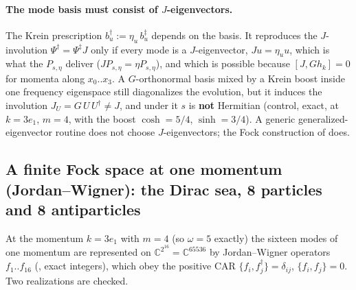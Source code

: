 \paragraph{The mode basis must consist of $J$-eigenvectors.} The Krein prescription
$b_u^{\dagger}:=\eta_u\,b_u^{\ddagger}$ depends on the basis. It reproduces the $J$-involution
$\Psi^{\dagger}=\Psi^{\ddagger}J$ only if every mode is a $J$-eigenvector, $Ju=\eta_u u$, which is what
the $P_{s,\eta}$ deliver ($JP_{s,\eta}=\eta P_{s,\eta}$), and which is possible because
$[J,Gh_k]=0$ for momenta along $x_0..x_3$. A $G$-orthonormal basis mixed by a Krein boost inside one
frequency eigenspace still diagonalizes the evolution, but it induces the involution
$J_U=G\,U\,U^{\dagger}\neq J$, and under it $s$ is \textbf{not} Hermitian (control, exact, at $k=3e_1$,
$m=4$, with the boost $\cosh=5/4$, $\sinh=3/4$). A generic generalized-eigenvector routine does not
choose $J$-eigenvectors; the Fock construction of  does. 

\subsection{A finite Fock space at one momentum (Jordan--Wigner): the Dirac sea, 8 particles and 8 antiparticles}
\label{sec:6.14}

At the momentum $k=3e_1$ with $m=4$ (so $\omega=5$ exactly) the sixteen modes of one momentum are
represented on $\mathbb C^{2^{16}}=\mathbb C^{65536}$ by Jordan--Wigner operators $f_1..f_{16}$
(, exact integers), which obey the positive CAR $\{f_i,f_j^{\dagger}\}=\delta_{ij}$,
$\{f_i,f_j\}=0$. Two realizations are checked.

